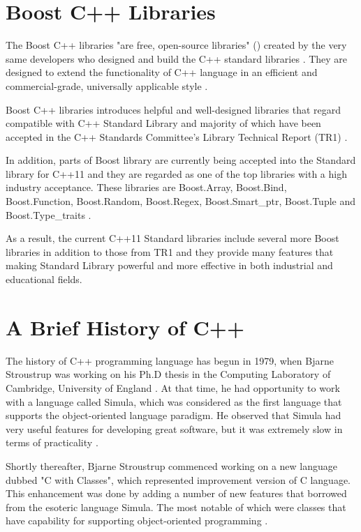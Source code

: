 \documentclass[11pt]{report}
\begin{document}
\section{Boost C++ Libraries}
\label{sec: Boost}
The Boost C++ libraries "are free, open-source libraries" (\cite{Deitel:2012:CPP}) created by the very same developers who designed and build the C++ standard libraries \cite{Schaling:2011:BoostCppLibraries}. They are designed to extend the functionality of C++ language in an efficient and commercial-grade, universally applicable style \cite{Boost:2007:Cpp}.

Boost C++ libraries introduces helpful and well-designed libraries that regard compatible with C++ Standard Library \cite{Deitel:2012:CPP} and majority of which have been accepted in the C++ Standards Committee's Library Technical Report (TR1) \cite{Boost:2007:Cpp}.

In addition, parts of Boost library are currently being accepted into the Standard library for C++11 \cite{Boost:2007:Cpp} and they are regarded as one of the top libraries with a high industry acceptance. These libraries are Boost.Array, Boost.Bind, Boost.Function, Boost.Random, Boost.Regex, Boost.Smart\_ptr, Boost.Tuple and Boost.Type\_traits \cite{Deitel:2012:CPP}.

As a result, the current C++11 Standard libraries include several more Boost libraries in addition to those from TR1 and they provide many features that making Standard Library powerful and more effective in both industrial and educational fields.


\section{A Brief History of C++}
\label{sec: History of C++}
The history of C++ programming language has begun in 1979, when Bjarne Stroustrup was working on his Ph.D thesis in the Computing Laboratory of Cambridge, University of England \cite{StroustrupHistory}. At that time, he had opportunity to work with a language called Simula, which was considered as the first language that supports the object-oriented language paradigm. He observed that Simula had very useful features for developing great software, but it was extremely slow in terms of practicality \cite{Stroustrup:2012:Cpp11}.

Shortly thereafter, Bjarne Stroustrup commenced working on a new language dubbed "C with Classes", which represented improvement version of C language. This enhancement was done by adding a number of new features that borrowed from the esoteric language Simula. The most notable of which were classes that have capability for supporting object-oriented programming \cite{StroustrupHistory}. 
\end{document}
